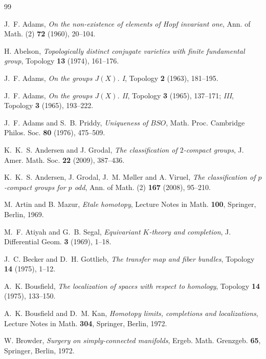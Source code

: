 \documentclass[11pt]{amsart}
\theoremstyle{plain}
\theoremstyle{definition}
\numberwithin{equation}{section}
\begin{document}
\begin{thebibliography}{99}
\small

J.~F. Adams, \emph{On the non-existence of elements of Hopf invariant one}, Ann. of Math. (2) \textbf{72} (1960), 20--104.

H. Abelson, \emph{Topologically distinct conjugate varieties with finite fundamental group}, Topology \textbf{13} (1974), 161--176.

J.~F. Adams, \emph{On the groups $J(X)$. I}, Topology \textbf{2} (1963), 181--195.

J.~F. Adams, \emph{On the groups $J(X)$. II}, Topology \textbf{3} (1965), 137--171; \emph{III}, Topology \textbf{3} (1965), 193--222.

J.~F. Adams and S.~B. Priddy, \emph{Uniqueness of $BSO$}, Math. Proc. Cambridge Philos. Soc. \textbf{80} (1976), 475--509.

K.~K.~S. Andersen and J. Grodal, \emph{The classification of $2$-compact groups}, J. Amer. Math. Soc. \textbf{22} (2009), 387--436.

K.~K.~S. Andersen, J. Grodal, J.~M. M{\o}ller and A. Viruel, \emph{The classification of $p$-compact groups for $p$ odd}, Ann. of Math. (2) \textbf{167} (2008), 95--210.

M. Artin and B. Mazur, \emph{Etale homotopy}, Lecture Notes in Math. \textbf{100}, Springer, Berlin, 1969.

M.~F. Atiyah and G.~B. Segal, \emph{Equivariant $K$-theory and completion}, J. Differential Geom. \textbf{3} (1969), 1--18.

J.~C. Becker and D.~H. Gottlieb, \emph{The transfer map and fiber bundles}, Topology \textbf{14} (1975), 1--12.

A.~K. Bousfield, \emph{The localization of spaces with respect to homology}, Topology \textbf{14} (1975), 133--150.

A.~K. Bousfield and D.~M. Kan, \emph{Homotopy limits, completions and localizations}, Lecture Notes in Math. \textbf{304}, Springer, Berlin, 1972.

W. Browder, \emph{Surgery on simply-connected manifolds}, Ergeb. Math. Grenzgeb. \textbf{65}, Springer, Berlin, 1972.


\end{thebibliography}
\end{document}
